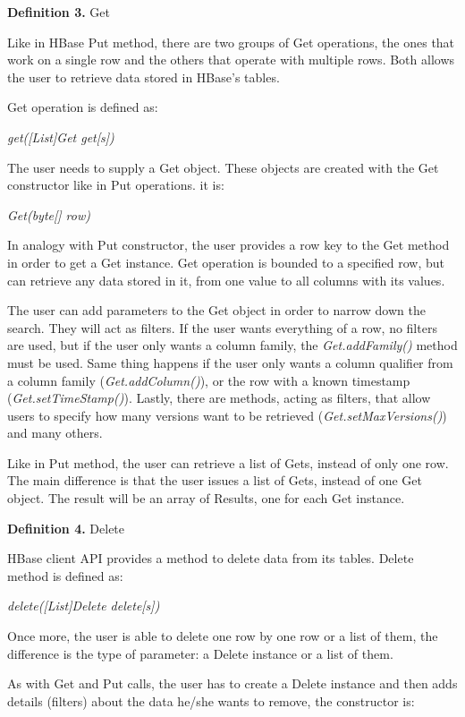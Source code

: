 \bigskip
\textbf{Definition 3.} Get

Like in HBase Put method, there are two groups of Get operations, the ones that work on a single row and the others that operate with multiple rows. Both allows the user to retrieve data stored in HBase's tables.
\par
Get operation is defined as:
\par
\bigskip
\centerline{\textit{get([List]Get get[s])}}
\bigskip
The user needs to supply a Get object. These objects are created with the Get constructor like in Put operations. it is:
\par
\bigskip
\centerline{\textit{Get(byte[] row)}}
\bigskip
In analogy with Put constructor, the user provides a row key to the Get method in order to get a Get instance. Get operation is bounded to a specified row, but can retrieve any data stored in it, from one value to all columns with its values.
\par
The user can add parameters to the Get object in order to narrow down the search. They will act as filters. If the user wants everything of a row, no filters are used, but if the user only wants a column family, the \textit{Get.addFamily()} method must be used. Same thing happens if the user only wants a column qualifier from a column family (\textit{Get.addColumn()}), or the row with a known timestamp (\textit{Get.setTimeStamp()}).
Lastly, there are methods, acting as filters, that allow users to specify how many versions want to be retrieved (\textit{Get.setMaxVersions()}) and many others.
\par
Like in Put method, the user can retrieve a list of Gets, instead of only one row. The main difference is that the user issues a list of Gets, instead of one Get object. The result will be an array of Results, one for each Get instance.

\bigskip
\textbf{Definition 4. }Delete

HBase client API provides a method to delete data from its tables. Delete method is defined as:

\par
\bigskip
\centerline{\textit{delete([List]Delete delete[s])}}
\bigskip
Once more, the user is able to delete one row by one row or a list of them, the difference is the type of parameter: a Delete instance or a list of them.
\par
As with Get and Put calls, the user has to create a Delete instance and then adds details (filters) about the data he/she wants to remove, the constructor is:

